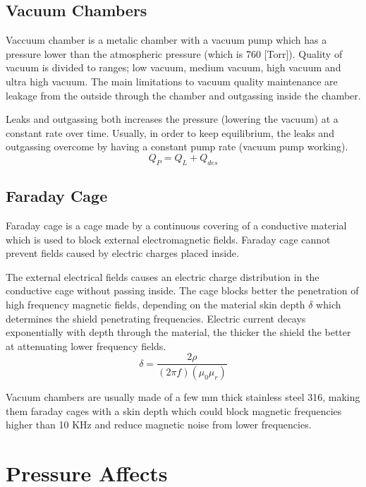 \documentclass[\main/master.tex]{subfiles}
\begin{document}
\subsection{Vacuum Chambers}
Vaccuum chamber is a metalic chamber with a vacuum pump which has a pressure lower than the atmospheric pressure (which is 760 [Torr]). Quality of vacuum is divided to ranges; low vacuum, medium vacuum, high vacuum and ultra high vacuum. The main limitations to vacuum quality maintenance are leakage from the outside through the chamber and outgassing inside the chamber.
\par
Leaks and outgassing both increases the pressure (lowering the vacuum) at a constant rate over time. Usually, in order to keep equilibrium, the leaks and outgassing overcome by having a constant pump rate (vacuum pump working).   
\begin{equation}
Q_P = Q_L + Q_{des}  \label{eqn:vacuum_equilibrium}
\end{equation}
\subsection{Faraday Cage}
Faraday cage is a cage made by a continuous covering of a conductive material which is used to block external electromagnetic fields. Faraday cage cannot prevent fields caused by electric charges placed inside.
\par
The external electrical fields causes an electric charge distribution in the conductive cage without passing inside. The cage blocks better the penetration of high frequency magnetic fields, depending on the material skin depth $\delta$ which determines the shield penetrating frequencies. Electric current decays exponentially with depth through the material, the thicker the shield the better at attenuating lower frequency fields.
\begin{equation}
\delta = \frac{2\rho}{(2\pi f)(\mu_0\mu_r)}     \label{eqn:mean-free-pass}
\end{equation}
\iffalse
Where $\rho$ is the material electric resistivity, and $\mu_r$ is the relative magnetic permeability.
\fi
Vacuum chambers are usually made of a few mm thick stainless steel 316, making them faraday cages with a skin depth which could block magnetic frequencies higher than 10 KHz and reduce magnetic noise from lower frequencies.


\section{Pressure Affects}
\end{document}

